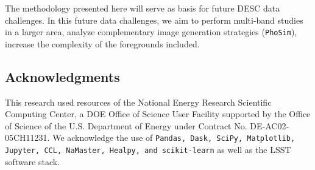 \documentclass[\docopts]{\docclass}
\begin{document}
The methodology presented here will serve as basis for future DESC data challenges. In this future data challenges, we aim to perform multi-band studies in a larger area, analyze complementary image generation strategies (\texttt{PhoSim}), increase the complexity of the foregrounds included.


\subsection*{Acknowledgments}

This research used resources of the National Energy Research Scientific Computing Center, a DOE Office of Science User Facility supported by the Office of Science of the U.S. Department of Energy under Contract No. DE-AC02-05CH11231. We acknowledge the use of \texttt{Pandas, Dask, SciPy, Matplotlib, Jupyter, CCL, NaMaster, Healpy, and scikit-learn} as well as the LSST software stack.






\appendix
\end{document}
